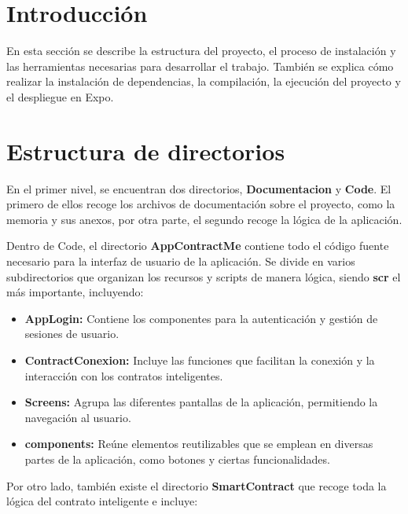 
\section{Introducción}

En esta sección se describe la estructura del proyecto, el proceso de instalación y las herramientas necesarias para desarrollar el trabajo. También se explica cómo realizar la instalación de dependencias, la compilación, la ejecución del proyecto y el despliegue en Expo.

\section{Estructura de directorios}

En el primer nivel, se encuentran dos directorios, \textbf{Documentacion} y \textbf{Code}. El primero de ellos recoge los archivos de documentación sobre el proyecto, como la memoria y sus anexos, por otra parte, el segundo recoge la lógica de la aplicación.

Dentro de Code, el directorio \textbf{AppContractMe} contiene todo el código fuente necesario para la interfaz de usuario de la aplicación. Se divide en varios subdirectorios que organizan los recursos y scripts de manera lógica, siendo \textbf{scr} el más importante, incluyendo:

\begin{itemize}

\item \textbf{AppLogin:} Contiene los componentes para la autenticación y gestión de sesiones de usuario.

\item \textbf{ContractConexion:} Incluye las funciones que facilitan la conexión y la interacción con los contratos inteligentes.

\item \textbf{Screens:} Agrupa las diferentes pantallas de la aplicación, permitiendo la navegación al usuario.

\item \textbf{components:} Reúne elementos reutilizables que se emplean en diversas partes de la aplicación, como botones y ciertas funcionalidades.

\end{itemize}

Por otro lado, también existe el directorio \textbf{SmartContract} que recoge toda la lógica del contrato inteligente e incluye:

